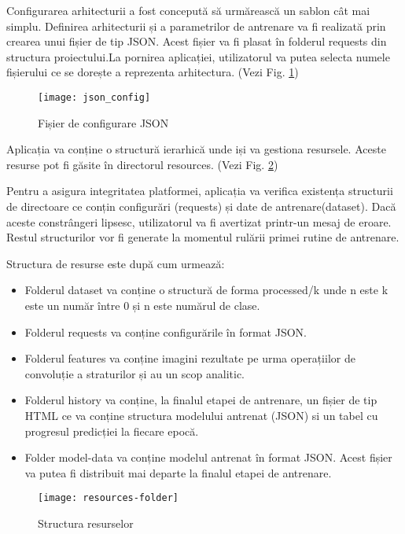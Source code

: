 	Configurarea arhitecturii a fost concepută să urmărească un sablon cât mai simplu. Definirea arhitecturii și a parametrilor de antrenare va fi realizată prin crearea unui fișier de tip JSON. 
	Acest fișier va fi plasat în folderul requests din structura proiectului.La pornirea aplicației, utilizatorul va putea selecta numele fișierului ce se dorește a reprezenta arhitectura. (Vezi Fig. \ref{fig:config_json}) 
	
	\begin{figure}[H]
		\texttt{[image: json\_config]}
		\caption{\label{fig:config_json} Fișier de configurare JSON}
	\end{figure}
	
	Aplicația va conține o structură ierarhică unde iși va gestiona resursele. Aceste resurse pot fi găsite în directorul resources. (Vezi Fig. \ref{fig:resources-folder})
	
	Pentru a asigura integritatea platformei, aplicația va verifica existența structurii de directoare ce conțin configurări (requests) și date de antrenare(dataset). Dacă aceste constrângeri lipsesc, utilizatorul va fi avertizat printr-un mesaj de eroare. Restul structurilor vor fi generate la momentul rulării primei rutine de antrenare.
	
	Structura de resurse este după cum urmează:
	\begin{itemize}
	\item Folderul dataset va conține o structură de forma processed/{k} unde n este k este un număr între 0 și n este numărul de clase.
	
	\item Folderul requests va conține configurările în format JSON.
	
	\item Folderul features va conține imagini rezultate pe urma operațiilor de convoluție a straturilor și au un scop analitic.
	
	\item Folderul history va conține, la finalul etapei de antrenare, un fișier de tip HTML ce va conține structura modelului antrenat (JSON) si un tabel cu progresul predicției la fiecare epocă.
	
	\item Folder model-data va conține modelul antrenat în format JSON. Acest fișier va putea fi distribuit mai departe la finalul etapei de antrenare.
	
	\end{itemize}
	
	\begin{figure}[H]
		\texttt{[image: resources-folder]}
		\caption{\label{fig:resources-folder} Structura resurselor}
	\end{figure}

